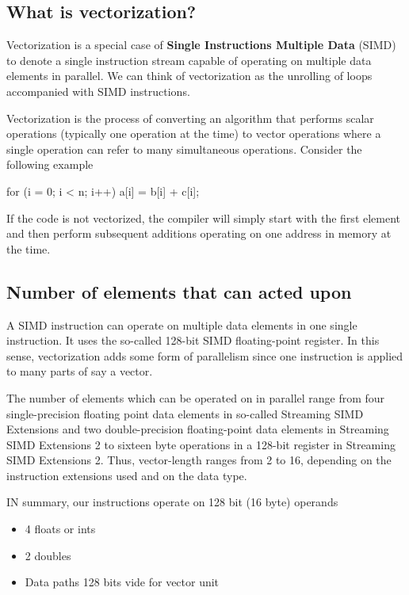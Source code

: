 \documentclass[%
oneside,                 %
final,                   %
10pt]{article}
\begin{document}
\noindent



\subsection{What is vectorization?}
Vectorization is a special
case of \textbf{Single Instructions Multiple Data} (SIMD) to denote a single
instruction stream capable of operating on multiple data elements in
parallel. 
We can think of vectorization as the unrolling of loops accompanied with SIMD instructions.

Vectorization is the process of converting an algorithm that performs scalar operations
(typically one operation at the time) to vector operations where a single operation can refer to many simultaneous operations.
Consider the following example




\bcppcod
for (i = 0; i < n; i++){
    a[i] = b[i] + c[i];
}

\ecppcod

If the code is not vectorized, the compiler will simply start with the first element and 
then perform subsequent additions operating on one address in memory at the time. 

\subsection{Number of elements that can acted upon}
A SIMD instruction can operate  on multiple data elements in one single instruction.
It uses the so-called 128-bit SIMD floating-point register. 
In this sense, vectorization adds some form of parallelism since one instruction is applied  
to many parts of say a vector.

The number of elements which can be operated on in parallel
range from four single-precision floating point data elements in so-called 
Streaming SIMD Extensions and two double-precision floating-point data
elements in Streaming SIMD Extensions 2 to sixteen byte operations in
a 128-bit register in Streaming SIMD Extensions 2. Thus, vector-length
ranges from 2 to 16, depending on the instruction extensions used and
on the data type. 

IN summary, our instructions  operate on 128 bit (16 byte) operands
\begin{itemize}
\item 4 floats or ints

\item 2 doubles

\item Data paths 128 bits vide for vector unit
\end{itemize}
\end{document}
